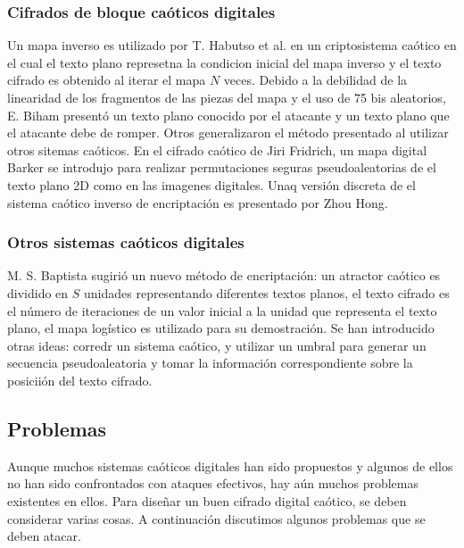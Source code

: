 \documentclass[prodmode,acmtap]{acmlarge}
\begin{document}
\subsubsection{Cifrados de bloque caóticos digitales}
Un mapa inverso es utilizado por T. Habutso  et al. en un criptosistema caótico en el cual el texto plano represetna la condicion inicial del mapa inverso y el texto cifrado es obtenido al iterar el mapa $N$ veces. Debido a la debilidad de la linearidad de los fragmentos de las piezas del mapa y el uso de 75 bis aleatorios, E. Biham presentó un texto plano conocido por el atacante y un texto plano que el atacante debe de romper.  Otros generalizaron el método presentado al utilizar otros sitemas caóticos. En el cifrado caótico de Jiri Fridrich, un mapa digital Barker se introdujo para realizar permutaciones  seguras pseudoaleatorias de el texto plano 2D como en las imagenes digitales. Unaq versión discreta de el sistema caótico inverso de encriptación es presentado por Zhou Hong.

\subsubsection{Otros sistemas caóticos digitales}
M. S. Baptista sugirió un nuevo método de encriptación: un atractor caótico es dividido en $S$ unidades representando diferentes textos planos, el texto cifrado es el número de iteraciones de un valor inicial a la unidad que representa el texto plano, el mapa logístico es utilizado para su demostración. Se han introducido otras ideas: corredr un sistema caótico, y utilizar un umbral para generar un secuencia pseudoaleatoria y tomar la información correspondiente sobre la posiciión del texto cifrado.

\subsection{Problemas}
Aunque muchos sistemas caóticos digitales han sido propuestos y algunos de ellos no han sido confrontados con ataques efectivos, hay aún muchos problemas existentes en ellos. Para diseñar un buen cifrado digital caótico, se deben considerar varias cosas. A continuación discutimos algunos problemas que se deben atacar.
\end{document}
